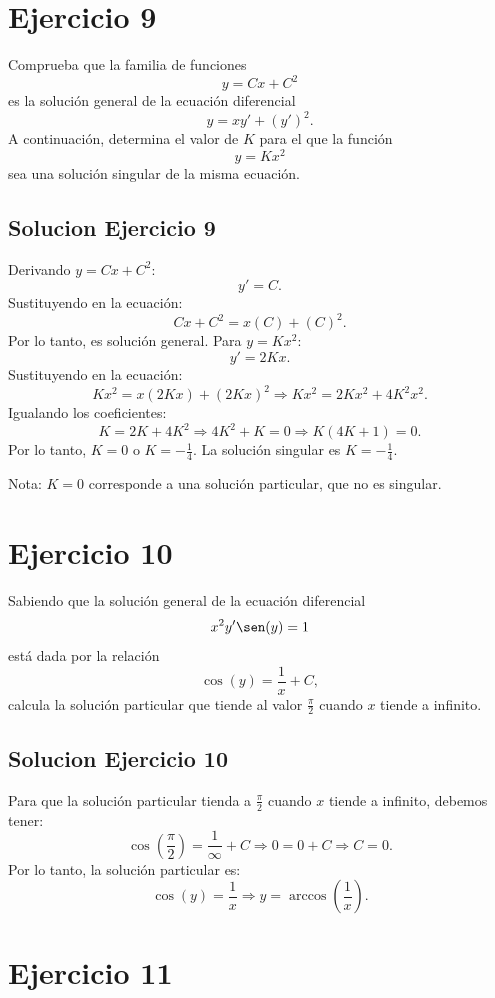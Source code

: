 \documentclass[12pt]{article}
\begin{document}
\section*{Ejercicio 9}

Comprueba que la familia de funciones
\[
y = Cx + C^2
\]
es la solución general de la ecuación diferencial
\[
y = x y' + (y')^2.
\]
A continuación, determina el valor de $K$ para el que la función
\[
y = Kx^2
\]
sea una solución singular de la misma ecuación.

\subsection*{Solucion Ejercicio 9}
Derivando $y = Cx + C^2$:
\[y' = C. \]
Sustituyendo en la ecuación:
\[Cx + C^2 = x(C) + (C)^2.\]
Por lo tanto, es solución general.
Para $y = Kx^2$:
\[y' = 2Kx. \]
Sustituyendo en la ecuación:
\[Kx^2 = x(2Kx) + (2Kx)^2 \Rightarrow Kx^2 = 2Kx^2 + 4K^2x^2.\]
Igualando los coeficientes:
\[K = 2K + 4K^2 \Rightarrow 4K^2 + K = 0 \Rightarrow K(4K + 1) = 0.\]
Por lo tanto, $K = 0$ o $K = -\frac{1}{4}$. La solución singular es $K = -\frac{1}{4}$.

Nota: $K=0$ corresponde a una solución particular, que no es singular.

\section*{Ejercicio 10}

Sabiendo que la solución general de la ecuación diferencial
\[
x^2 y' \sen(y) = 1
\]
está dada por la relación
\[
\cos(y) = \frac{1}{x} + C,
\]
calcula la solución particular que tiende al valor $\displaystyle \frac{\pi}{2}$ cuando $x$ tiende a infinito.

\subsection*{Solucion Ejercicio 10}
Para que la solución particular tienda a $\frac{\pi}{2}$ cuando $x$ tiende a infinito, debemos tener:
\[\cos\left(\frac{\pi}{2}\right) = \frac{1}{\infty} + C \Rightarrow 0 = 0 + C \Rightarrow C = 0.\]
Por lo tanto, la solución particular es:
\[\cos(y) = \frac{1}{x} \Rightarrow y = \arccos\left(\frac{1}{x}\right).\]

\section*{Ejercicio 11}
\end{document}
